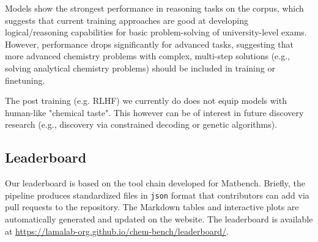 Models show the strongest performance in reasoning tasks on the \chembench corpus, which suggests that current training approaches are good at developing logical/reasoning capabilities for basic problem-solving of university-level exams. However, performance drops significantly for advanced tasks, suggesting that more advanced chemistry problems with complex, multi-step solutions (e.g., solving analytical chemistry problems) should be included in training or finetuning.

The post training (e.g. RLHF) we currently do does not equip models with human-like "chemical taste". This however can be of interest in future discovery research (e.g., discovery via constrained decoding or genetic algorithms).

\clearpage
\subsection{Leaderboard}
\label{sec:leaderboard}
Our leaderboard is based on the tool chain developed for Matbench.\autocite{Dunn_2020}
Briefly, the \chembench pipeline produces standardized files in \texttt{json} format that contributors can add via pull requests to the \chembench repository.
The Markdown tables and interactive plots are automatically generated and updated on the \chembench website. The leaderboard is available at \url{https://lamalab-org.github.io/chem-bench/leaderboard/}.

\clearpage

\printnoidxglossary[type=\acronymtype, nonumberlist]  %
